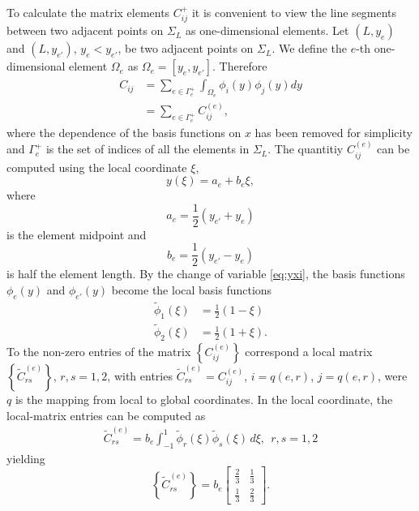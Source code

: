 \documentclass[11pt]{article}
\newcommand{\wt}[1]{\widetilde{#1}}
\begin{document}
To calculate the matrix elements $C_{ij}^+$ it is convenient to view the line segments between two adjacent points on $\Sigma_L$  as one-dimensional elements. Let $(L,y_e)$ and $(L,y_{e'})$, $y_e < y_{e'}$, be two adjacent points on $\Sigma_L$. We define the $e$-th one-dimensional element $\Omega_e$ as $\Omega_e = [y_e, y_{e'}]$. Therefore
\begin{align}
  \label{eq:20}
  C_{ij} &= \sum_{e \in \Gamma_e^+} \int_{\Omega_e} \phi_i(y)\phi_j(y) dy \\
         &= \sum_{e \in \Gamma_e^+} C_{ij}^{(e)},
\end{align}
where the dependence of the basis functions on $x$ has been removed for simplicity and $\Gamma_e^+$ is the set of indices of all the elements in $\Sigma_L$. The quantitiy $C_{ij}^{(e)}$ can be computed using the local coordinate $\xi$,
\begin{equation}
  \label{eq:yxi}
  y(\xi) = a_e + b_e\xi,
\end{equation}
where
\begin{equation}
  \label{eq:24}
  a_e =  \frac{1}{2}(y_{e'} + y_e)
\end{equation}
is the element midpoint and
\begin{equation}
  \label{eq:25}
  b_e = \frac{1}{2}(y_{e'} - y_e)
\end{equation}
is half the element length. By the change of variable \eqref{eq:yxi}, the basis functions $\phi_e(y)$ and $\phi_{e'}(y)$ become the local basis functions
\begin{align}
  \wt{\phi}_1(\xi) &= \frac{1}{2}(1-\xi) \\
  \wt{\phi}_2(\xi) &= \frac{1}{2}(1+\xi).
\end{align}
To the non-zero entries of the matrix $\left\{C_{ij}^{(e)}\right\}$ correspond a local matrix $\left\{\wt{C}_{rs}^{(e)}\right\}$, $r,s=1,2$, with entries $\wt{C}_{rs}^{(e)} = C_{ij}^{(e)}$, $i=q(e,r)$, $j=q(e,r)$, were $q$ is the mapping from local to global coordinates. In the local coordinate, the local-matrix entries can be computed as
\begin{align}
  \wt{C}_{rs}^{(e)} = b_e\int_{-1}^1 \wt{\phi}_r(\xi)\wt{\phi}_s(\xi)\,d\xi,~~r,s=1,2
\end{align}
yielding
\begin{equation}
  \label{eq:21}
  \left\{\wt{C}_{rs}^{(e)}\right\} = b_e
  \begin{bmatrix}
    \frac{2}{3} & \frac{1}{3} \\[1mm]
    \frac{1}{3} & \frac{2}{3}
  \end{bmatrix}.
\end{equation}
\end{document}
